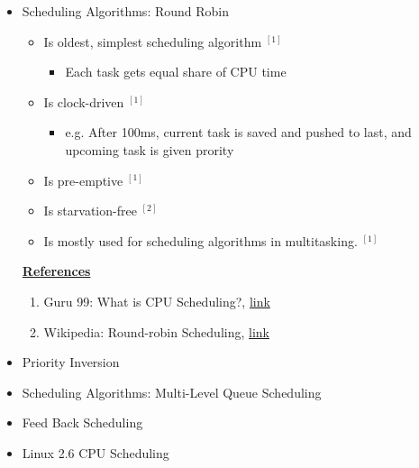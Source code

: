 \documentclass[12pt]{article}
\begin{document}
\begin{itemize}
    \item Scheduling Algorithms: Round Robin
    \begin{itemize}
        \item Is oldest, simplest scheduling algorithm $^{[1]}$
        \begin{itemize}
            \item Each task gets equal share of CPU time
        \end{itemize}
        \item Is clock-driven $^{[1]}$
        \begin{itemize}
            \item e.g. After 100ms, current task is saved and pushed to last, and
            upcoming task is given prority
        \end{itemize}
        \item Is pre-emptive $^{[1]}$
        \item Is starvation-free $^{[2]}$
        \item Is mostly used for scheduling algorithms in multitasking. $^{[1]}$
    \end{itemize}

    \bigskip

    \underline{\textbf{References}}

    \begin{enumerate}[1)]
        \item Guru 99: What is CPU Scheduling?, \href{https://www.guru99.com/cpu-scheduling-algorithms.html#8}{link}
        \item Wikipedia: Round-robin Scheduling, \href{https://en.wikipedia.org/wiki/Round-robin_scheduling}{link}
    \end{enumerate}
    \item Priority Inversion
    \item Scheduling Algorithms: Multi-Level Queue Scheduling
    \item Feed Back Scheduling
    \item Linux 2.6 CPU Scheduling
\end{itemize}
\end{document}

